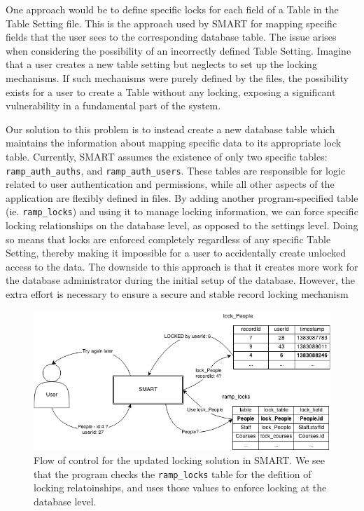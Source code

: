 \documentclass[12pt]{article}
\newcommand{\code}[1]{\texttt{#1}}
\begin{document}
One approach would be to define specific locks for each field of a Table in the Table Setting file. This is the approach used by SMART for mapping specific fields that the user sees to the corresponding database table. The issue arises when considering the possibility of an incorrectly defined Table Setting. Imagine that a user creates a new table setting but neglects to set up the locking mechanisms. If such mechanisms were purely defined by the files, the possibility exists for a user to create a Table without any locking, exposing a significant vulnerability in a fundamental part of the system.

Our solution to this problem is to instead create a new database table which maintains the information about mapping specific data to its appropriate lock table. Currently, SMART assumes the existence of only two specific tables: \code{ramp\_auth\_auths}, and \code{ramp\_auth\_users}. These tables are responsible for logic related to user authentication and permissions, while all other aspects of the application are flexibly defined in files. By adding another program-specified table (ie. \code{ramp\_locks}) and using it to manage locking information, we can force specific locking relationships on the database level, as opposed to the settings level. Doing so means that locks are enforced completely regardless of any specific Table Setting, thereby making it impossible for a user to accidentally create unlocked access to the data. The downside to this approach is that it creates more work for the database administrator during the initial setup of the database. However, the extra effort is necessary to ensure a secure and stable record locking mechanism

\newpage

\begin{center}
\begin{figure}[h]
    \vspace{-10pt}
    \centering
    \centerline{\includegraphics[width=6.5in]{diagrams/SecondLockDesign.png}}
    \begin{spacing}{1.0}\caption{Flow of control for the updated locking solution in SMART. We see that the program checks the \code{ramp\_locks} table for the defition of locking relatoinships, and uses those values to enforce locking at the database level.}\end{spacing}
    \vspace{-20pt}
\end{figure}
\end{center}
\end{document}

